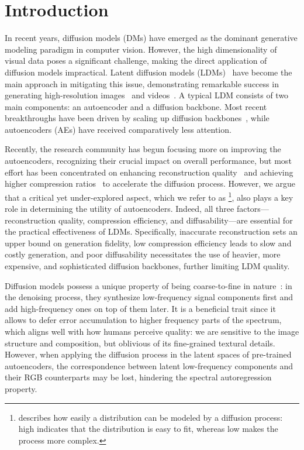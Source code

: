 \section{Introduction}
\label{sec:intro}



In recent years, diffusion models (DMs) have emerged as the dominant generative modeling paradigm in computer vision.
However, the high dimensionality of visual data poses a significant challenge, making the direct application of diffusion models impractical.
Latent diffusion models (LDMs)~\cite{LSGM,LDM} have become the main approach in mitigating this issue, demonstrating remarkable success in generating high-resolution images~\cite{Flux, DALLE-3, SD3} and videos~\cite{Sora, CogVideoX, HunyuanVideo}.
A typical LDM consists of two main components: an autoencoder and a diffusion backbone.
Most recent breakthroughs have been driven by scaling up diffusion backbones~\cite{DiT}, while autoencoders (AEs) have received comparatively less attention.

Recently, the research community has begun focusing more on improving the autoencoders, recognizing their crucial impact on overall performance, but most effort has been concentrated on enhancing reconstruction quality~\cite{Flux, CogVideo, CosmosTokenizer, LTX-video, DC-AE} and achieving higher compression ratios~\cite{CosmosTokenizer, LTX-video, DC-AE} to accelerate the diffusion process.
However, we argue that a critical yet under-explored aspect, which we refer to as \diffusability\footnote{\Diffusability describes how easily a distribution can be modeled by a diffusion process: high \diffusability indicates that the distribution is easy to fit, whereas low \diffusability makes the process more complex.}, also plays a key role in determining the utility of autoencoders.
Indeed, all three factors---reconstruction quality, compression efficiency, and diffusability---are essential for the practical effectiveness of LDMs.
Specifically, inaccurate reconstruction sets an upper bound on generation fidelity, low compression efficiency leads to slow and costly generation, and poor diffusability necessitates the use of heavier, more expensive, and sophisticated diffusion backbones, further limiting LDM quality.

Diffusion models possess a unique property of being coarse-to-fine in nature~\cite{spectral-autoregression, DCTdiff}: in the denoising process, they synthesize low-frequency signal components first and add high-frequency ones on top of them later.
It is a beneficial trait since it allows to defer error accumulation to higher frequency parts of the spectrum, which aligns well with how humans perceive quality: we are sensitive to the image structure and composition, but oblivious of its fine-grained textural details.
However, when applying the diffusion process in the latent spaces of pre-trained autoencoders, the correspondence between latent low-frequency components and their RGB counterparts may be lost, hindering the spectral autoregression property.

